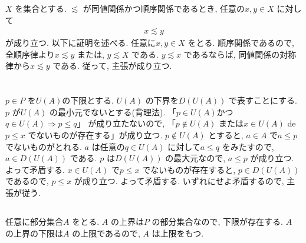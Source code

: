 \documentclass[10pt, fleqn, label-section=none]{bxjsarticle}
\title{ }
\date{}
\author{}
\theoremstyle{definition}
\newcommand{\naraba}{\Rightarrow}
\renewcommand{\;}{\, ; \,}
\begin{document}
\maketitle




\section{}
\subsection{}

$X$ を集合とする. $\lesssim$ が同値関係かつ順序関係であるとき, 任意の$x, y \in X$ に対して
\begin{align*} x \lesssim y\end{align*}
が成り立つ. 以下に証明を述べる. 
任意に$x, y \in X$ をとる. 順序関係であるので, 全順序律より$x \lesssim y$ または, $y \lesssim X$ である. $y \lesssim x$ であるならば, 同値関係の対称律から$x \lesssim y$ である. 従って, 主張が成り立つ. 


\section{}
\subsection{}


$p \in P $ を$U(A)$の下限とする.  $U(A)$ の下界を$D(U(A))$ で表すことにする. $p$ が$U(A)$ の最小元でないとする(背理法). 「$p \in U(A)$かつ$q \in U(A) \naraba p \leq q$」 が成り立たないので, 「$p \notin U(A)$ または$x \in U(A)$  de
$p \leq x$ でないものが存在する」が成り立つ. $p \notin U(A)$ とすると, $a \in A$ で$a \leq p$ でないものがとれる. $a$ は任意の$q \in U(A)$ に対して$a \leq q$ をみたすので, $a \in D(U(A))$ である. $p$ は$D(U(A))$ の最大元なので, $a \leq p$ が成り立つ. よって矛盾する. $x \in U(A)$ で$p \leq x$ でないものが存在すると, $p \in D(U(A))$ であるので, $p \leq x$ が成り立つ. よって矛盾する. いずれにせよ矛盾するので, 主張が従う. 

\subsection{}
任意に部分集合$A$ をとる. $A$ の上界は$P$ の部分集合なので, 下限が存在する. $A$ の上界の下限は$A$ の上限であるので, $A$ は上限をもつ. 
\end{document}
